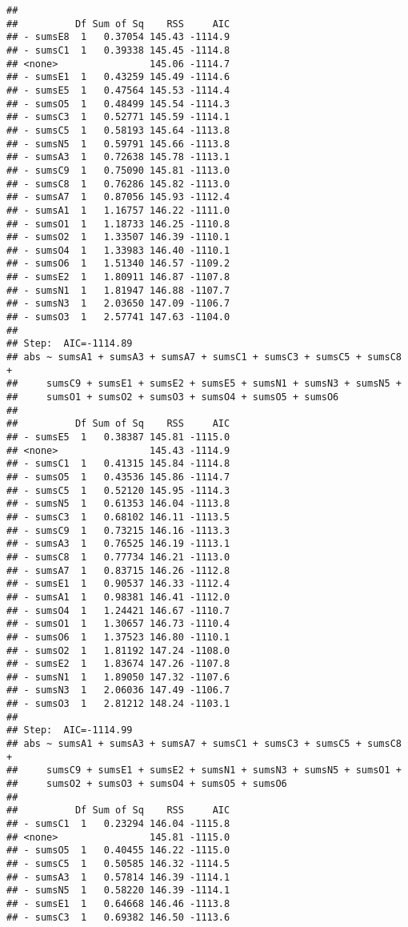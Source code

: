 \documentclass[,man,floatsintext]{apa6}
\begin{document}
\begin{verbatim}
## 
##          Df Sum of Sq    RSS     AIC
## - sumsE8  1   0.37054 145.43 -1114.9
## - sumsC1  1   0.39338 145.45 -1114.8
## <none>                145.06 -1114.7
## - sumsE1  1   0.43259 145.49 -1114.6
## - sumsE5  1   0.47564 145.53 -1114.4
## - sumsO5  1   0.48499 145.54 -1114.3
## - sumsC3  1   0.52771 145.59 -1114.1
## - sumsC5  1   0.58193 145.64 -1113.8
## - sumsN5  1   0.59791 145.66 -1113.8
## - sumsA3  1   0.72638 145.78 -1113.1
## - sumsC9  1   0.75090 145.81 -1113.0
## - sumsC8  1   0.76286 145.82 -1113.0
## - sumsA7  1   0.87056 145.93 -1112.4
## - sumsA1  1   1.16757 146.22 -1111.0
## - sumsO1  1   1.18733 146.25 -1110.8
## - sumsO2  1   1.33507 146.39 -1110.1
## - sumsO4  1   1.33983 146.40 -1110.1
## - sumsO6  1   1.51340 146.57 -1109.2
## - sumsE2  1   1.80911 146.87 -1107.8
## - sumsN1  1   1.81947 146.88 -1107.7
## - sumsN3  1   2.03650 147.09 -1106.7
## - sumsO3  1   2.57741 147.63 -1104.0
## 
## Step:  AIC=-1114.89
## abs ~ sumsA1 + sumsA3 + sumsA7 + sumsC1 + sumsC3 + sumsC5 + sumsC8 + 
##     sumsC9 + sumsE1 + sumsE2 + sumsE5 + sumsN1 + sumsN3 + sumsN5 + 
##     sumsO1 + sumsO2 + sumsO3 + sumsO4 + sumsO5 + sumsO6
## 
##          Df Sum of Sq    RSS     AIC
## - sumsE5  1   0.38387 145.81 -1115.0
## <none>                145.43 -1114.9
## - sumsC1  1   0.41315 145.84 -1114.8
## - sumsO5  1   0.43536 145.86 -1114.7
## - sumsC5  1   0.52120 145.95 -1114.3
## - sumsN5  1   0.61353 146.04 -1113.8
## - sumsC3  1   0.68102 146.11 -1113.5
## - sumsC9  1   0.73215 146.16 -1113.3
## - sumsA3  1   0.76525 146.19 -1113.1
## - sumsC8  1   0.77734 146.21 -1113.0
## - sumsA7  1   0.83715 146.26 -1112.8
## - sumsE1  1   0.90537 146.33 -1112.4
## - sumsA1  1   0.98381 146.41 -1112.0
## - sumsO4  1   1.24421 146.67 -1110.7
## - sumsO1  1   1.30657 146.73 -1110.4
## - sumsO6  1   1.37523 146.80 -1110.1
## - sumsO2  1   1.81192 147.24 -1108.0
## - sumsE2  1   1.83674 147.26 -1107.8
## - sumsN1  1   1.89050 147.32 -1107.6
## - sumsN3  1   2.06036 147.49 -1106.7
## - sumsO3  1   2.81212 148.24 -1103.1
## 
## Step:  AIC=-1114.99
## abs ~ sumsA1 + sumsA3 + sumsA7 + sumsC1 + sumsC3 + sumsC5 + sumsC8 + 
##     sumsC9 + sumsE1 + sumsE2 + sumsN1 + sumsN3 + sumsN5 + sumsO1 + 
##     sumsO2 + sumsO3 + sumsO4 + sumsO5 + sumsO6
## 
##          Df Sum of Sq    RSS     AIC
## - sumsC1  1   0.23294 146.04 -1115.8
## <none>                145.81 -1115.0
## - sumsO5  1   0.40455 146.22 -1115.0
## - sumsC5  1   0.50585 146.32 -1114.5
## - sumsA3  1   0.57814 146.39 -1114.1
## - sumsN5  1   0.58220 146.39 -1114.1
## - sumsE1  1   0.64668 146.46 -1113.8
## - sumsC3  1   0.69382 146.50 -1113.6

\end{verbatim}
\end{document}
